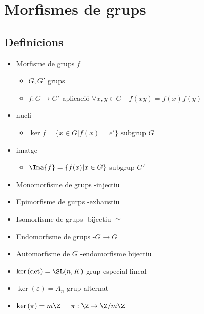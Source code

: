 \section{Morfismes de grups}
\subsection*{Definicions}
\begin{itemize}
\item Morfisme de grups $f$
	\begin{itemize}
	\item $G, G'$ grups
	\item $f:G\to G'$ aplicació
		\subitem $\forall x, y \in G\quad f(xy) = f(x)f(y)$
	\end{itemize}
\item nucli
	\begin{itemize}
	\item $\ker{f} = \{x \in G | f(x) = e'\}$ subgrup $G$
	\end{itemize}
\item imatge
	\begin{itemize}
	\item $\Ima{f} = \{f(x)| x \in G\}$ subgrup $G'$
	\end{itemize}
\item Monomorfisme de grups -injectiu
\item Epimorfisme de gurps -exhaustiu
\item Isomorfisme de grups -bijectiu $\simeq$
\item Endomorfisme de grups -$G \to G$
\item Automorfisme de $G$ -endomorfisme bijectiu

\item $\ker{(\det)} = \SL(n, K)$ grup especial lineal
\item $\ker{(\varepsilon)} = A_n$ grup alternat
\item $\ker{(\pi)} = m\Z$ $\quad \pi:\Z \to \Z/m\Z$
\end{itemize}

